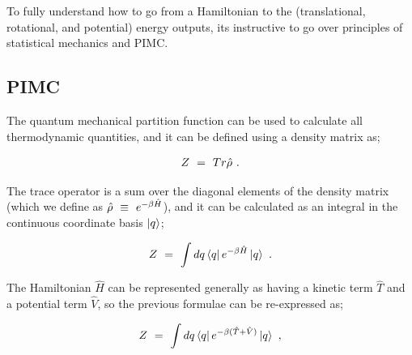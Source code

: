 \documentclass[11pt]{article}
\begin{document}
To fully understand how to go from a Hamiltonian to the (translational, rotational, and potential) energy outputs, its instructive to go over principles of statistical mechanics and PIMC. 

\subsection{PIMC}

The quantum mechanical partition function can be used to calculate all thermodynamic quantities, and it can be defined using a density matrix as;

\begin{equation} \label{wr-eq-2-1}
Z \hspace{0.125cm} = \hspace{0.125cm} Tr \hat{\rho} \hspace{0.125cm} .
\end{equation}

The trace operator is a sum over the diagonal elements of the density matrix (which we define as \begin{math} \hat{\rho} \hspace{0.125cm} \equiv \hspace{0.125cm} e^{-\beta \hat{H}} \end{math}), and it can be calculated as an integral in the continuous coordinate basis \begin{math} \ket{q} \end{math};

\begin{equation} \label{wr-eq-3-1}
Z \hspace{0.125cm} = \hspace{0.125cm} \int dq \bra{q} e^{-\beta \hat{H}} \ket{q} \hspace{0.125cm} .
\end{equation}

The Hamiltonian \begin{math} \hat{H} \end{math} can be represented generally as having a kinetic term \begin{math} \hat{T} \end{math} and a potential term \begin{math} \hat{V} \end{math}, so the previous formulae can be re-expressed as;

\begin{equation} \label{wr-eq-4-1}
Z  \hspace{0.125cm} = \hspace{0.125cm} \int dq \bra{q} e^{-\beta ( \hat{T} + \hat{V} )}\ket{q} \hspace{0.125cm} , 
\end{equation}
\end{document}
